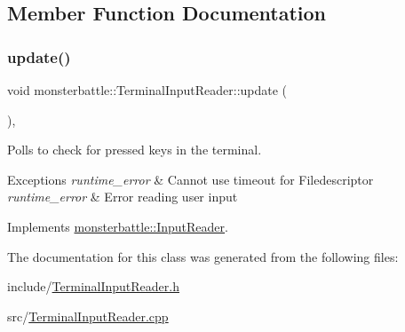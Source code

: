 \subsection{Member Function Documentation}
\mbox{\label{classmonsterbattle_1_1TerminalInputReader_ab665f9a9907e3435acdbf10c14ebb307}} 
\subsubsection{\texorpdfstring{update()}{update()}}
{\footnotesize\ttfamily void monsterbattle\+::\+Terminal\+Input\+Reader\+::update (\begin{DoxyParamCaption}{ }\end{DoxyParamCaption})\hspace{0.3cm}{\ttfamily [override]}, {\ttfamily [virtual]}}



Polls to check for pressed keys in the terminal. 


\begin{DoxyExceptions}{Exceptions}
{\em runtime\+\_\+error} & Cannot use timeout for Filedescriptor \\
\hline
{\em runtime\+\_\+error} & Error reading user input \\
\hline
\end{DoxyExceptions}


Implements \hyperlink{classmonsterbattle_1_1InputReader}{monsterbattle\+::\+Input\+Reader}.



The documentation for this class was generated from the following files\+:\begin{DoxyCompactItemize}
\item 
include/\hyperlink{TerminalInputReader_8h}{Terminal\+Input\+Reader.\+h}\item 
src/\hyperlink{TerminalInputReader_8cpp}{Terminal\+Input\+Reader.\+cpp}\end{DoxyCompactItemize}
